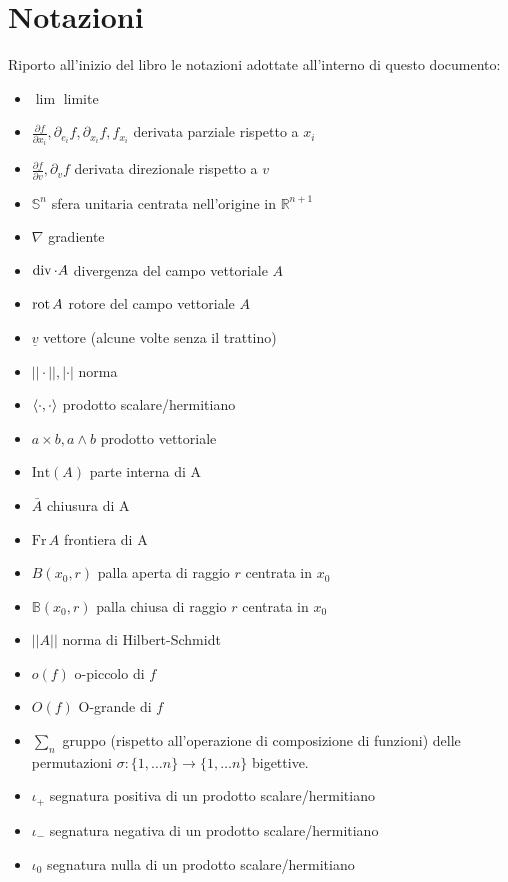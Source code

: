 \documentclass[oneside, italian, fontsize=10pt]{book}
\begin{document}
	\chapter*{Notazioni}
	Riporto all'inizio del libro le notazioni adottate all'interno di questo documento:
	\begin{itemize}[label=\hspace{-0.5em}]
		\item $\lim$ limite		
		\item $\frac{\partial f}{\partial x_i}, \partial_{e_i} f, \partial_{x_i} f, f_{x_i}$ derivata parziale rispetto a $x_i$
		\item $\frac{\partial f}{\partial v}, \partial_v f$ derivata direzionale rispetto a $v$
		\item $\mathbb{S}^{n}$ sfera unitaria centrata nell'origine in $\mathbb{R}^{n+1}$
		\item $\nabla$ gradiente
		\item $\operatorname{div} \cdot A$ divergenza del campo vettoriale $A$
		\item $\operatorname{rot} A$ rotore del campo vettoriale $A$
		\item $\underline{v}$ vettore (alcune volte senza il trattino)
		\item $||\cdot||, |\cdot|$ norma
		\item $\langle \cdot, \cdot \rangle$ prodotto scalare/hermitiano
		\item $a \times b, a \wedge b$ prodotto vettoriale
		\item $\text{Int}(A)$ parte interna di A
		\item $\bar{A}$ chiusura di A
		\item $\text{Fr} \, A$ frontiera di A
		\item $B(x_0, r)$ palla aperta di raggio $r$ centrata in $x_0$
		\item $\mathbb{B}(x_0, r)$ palla chiusa di raggio $r$ centrata in $x_0$
		\item $|| A ||$ norma di Hilbert-Schmidt
		\item $o(f)$ o-piccolo di $f$
		\item $O(f)$ O-grande di $f$
		\item $\sum_{n}$ gruppo (rispetto all'operazione di composizione di funzioni) delle permutazioni $\sigma: \{1, \ldots n \} \to \{1, \ldots n \}$ bigettive.
		\item $\iota_+$ segnatura positiva di un prodotto scalare/hermitiano
		\item $\iota_-$ segnatura negativa di un prodotto scalare/hermitiano
		\item $\iota_0$ segnatura nulla di un prodotto scalare/hermitiano

\end{itemize}
\end{document}

